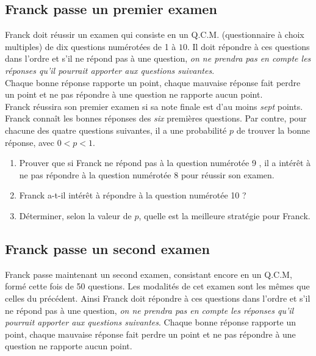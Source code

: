 \documentclass[landscape,twocolumn,leqno,a4paper,10pt]{report} %
\newcommand\n{\noindent}
\begin{document}
\subsection{Franck passe un premier examen}

\n Franck doit réussir un examen qui consiste en un Q.C.M. (questionnaire à choix multiples) de dix questions numérotées de 1 à $10$. Il doit répondre à ces questions dans l'ordre et s'il ne répond pas à une question, \textit{on ne prendra pas en compte les réponses qu'il pourrait apporter aux questions suivantes}.\\

\n Chaque bonne réponse rapporte un point, chaque mauvaise réponse fait perdre un point et ne pas répondre à une question ne rapporte aucun point.\\

\n Franck réussira son premier examen si sa note finale est d'au moins \textit{sept} points.\\

\n Franck connaît les bonnes réponses des \textit{six} premières questions. Par contre, pour chacune des quatre questions suivantes, il a une probabilité $p$ de trouver la bonne réponse, avec $0<p<1$.

\begin{enumerate}
	\item Prouver que si Franck ne répond pas à la question numérotée 9 , il a intérêt à ne pas répondre à la question numérotée 8 pour réussir son examen.
	\item Franck a-t-il intérêt à répondre à la question numérotée 10 ?
	\item Déterminer, selon la valeur de $p$, quelle est la meilleure stratégie pour Franck.
\end{enumerate}


\subsection{Franck passe un second examen}

\n Franck passe maintenant un second examen, consistant encore en un Q.C.M, formé cette fois de 50 questions. Les modalités de cet examen sont les mêmes que celles du précédent. Ainsi Franck doit répondre à ces questions dans l'ordre et s'il ne répond pas à une question, \textit{on ne prendra pas en compte les réponses qu'il pourrait apporter aux questions suivantes}. Chaque bonne réponse rapporte un point, chaque mauvaise réponse fait perdre un point et ne pas répondre à une question ne rapporte aucun point.\\
\end{document}
